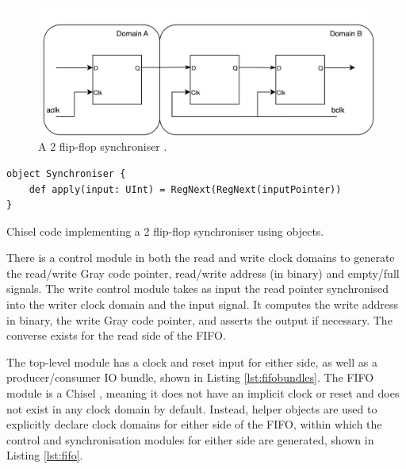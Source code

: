 \begin{figure}[H]
    \centering
    \includegraphics[width=\textwidth]{../img/2ff.png}
    \caption{A 2 flip-flop synchroniser \cite{cdc}.}
    \label{fig:2ff}
\end{figure}

\begin{listing}[h!]
    \vspace{0.5cm}
    \begin{verbatim}
object Synchroniser {
    def apply(input: UInt) = RegNext(RegNext(inputPointer))
}        
    \end{verbatim}
    \caption{Chisel code implementing a 2 flip-flop synchroniser using  objects.}
    \label{lst:2ff}
\end{listing}

There is a control module in both the read and write clock domains to generate the read/write Gray code pointer, read/write address (in binary) and empty/full signals. The write control module takes as input the read pointer synchronised into the writer clock domain and the  input signal. It computes the write address in binary, the write Gray code pointer, and asserts the  output if necessary. The converse exists for the read side of the FIFO.

The top-level module has a clock and reset input for either side, as well as a producer/consumer IO bundle, shown in Listing \ref{lst:fifobundles}. The FIFO module is a Chisel , meaning it does not have an implicit clock or reset and does not exist in any clock domain by default. Instead,  helper objects are used to explicitly declare clock domains for either side of the FIFO, within which the control and synchronisation modules for either side are generated, shown in Listing \ref{lst:fifo}.

